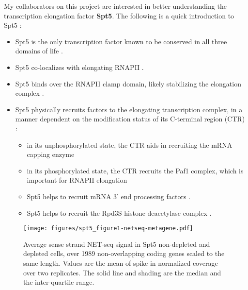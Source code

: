 \documentclass[9pt, letterpaper]{article}
\begin{document}
My collaborators on this project are interested in better understanding the transcription elongation factor \textbf{Spt5}. The following is a quick introduction to Spt5 \cite{shetty2017}:

\begin{itemize}[nosep, topsep=.5em]
    \item Spt5 is the only transcription factor known to be conserved in all three domains of life \cite{hartzog2013, werner2012}.
    \item Spt5 co-localizes with elongating RNAPII \cite{mayer2010, rahl2010}.
    \item Spt5 binds over the RNAPII clamp domain, likely stabilizing the elongation complex \cite{hirtreiter2010, klein2011, martinez-rucobo2011}.
    \item Spt5 physically recruits factors to the elongating transcription complex, in a manner dependent on the modification status of its C-terminal region (CTR) \cite{hartzog2013}:
    \begin{itemize}[nosep]
        \item in its unphosphorylated state, the CTR aids in recruiting the mRNA capping enzyme \cite{doamekpor2014, doamekpor2015, schneider2010, wen1999}
        \item in its phosphorylated state, the CTR recruits the Paf1 complex, which is important for RNAPII elongation \cite{liu2009, mbogning2013, wier2013, zhou2009}
        \item Spt5 helps to recruit mRNA 3' end processing factors \cite{mayer2012, stadelmayer2014, yamamoto2014}.
        \item Spt5 helps to recruit the Rpd3S histone deacetylase complex \cite{drouin2010}.
    \end{itemize}
\end{itemize}

\begin{wrapfigure}[16]{r}{8.52cm}
\centering
\texttt{[image: figures/spt5\_figure1-netseq-metagene.pdf]}
\caption{Average sense strand NET-seq signal in Spt5 non-depleted and depleted cells, over 1989 non-overlapping coding genes scaled to the same length. Values are the mean of spike-in normalized coverage over two replicates. The solid line and shading are the median and the inter-quartile range.}
\label{fig:spt5_netseq-metagene}
\end{wrapfigure}
\end{document}
